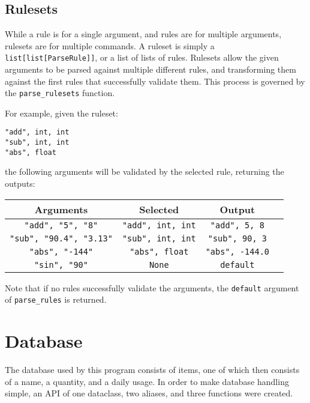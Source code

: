 \documentclass{article}
\begin{document}
			\subsection{Rulesets}
			While a rule is for a single argument, and rules are for multiple arguments, rulesets
			are for multiple commands. A ruleset is simply a \verb|list[list[ParseRule]]|, or a
			list of lists of rules. Rulesets allow the given arguments to be parsed against
			multiple different rules, and transforming them against the first rules that
			successfully validate them. This process is governed by the \verb|parse_rulesets|
			function.

			For example, given the ruleset:

			\begin{center}
				\verb|"add", int, int| \\
				\verb|"sub", int, int| \\
				\verb|"abs", float|    \\
			\end{center}

			the following arguments will be validated by the selected rule, returning the outputs:

			\begin{center}
				\begin{tabular}{|c|c|c|c|}
					\hline
					Arguments & Selected & Output
					\\ \hline
						\verb|"add", "5", "8"| &
						\verb|"add", int, int| &
						\verb|"add", 5, 8|
					\\ \hline
						\verb|"sub", "90.4", "3.13"| &
						\verb|"sub", int, int| &
						\verb|"sub", 90, 3|
					\\ \hline
						\verb|"abs", "-144"| &
						\verb|"abs", float| &
						\verb|"abs", -144.0|
					\\ \hline
						\verb|"sin", "90"| &
						\verb|None| &
						\verb|default|
					\\ \hline
				\end{tabular}
			\end{center}

			Note that if no rules successfully validate the arguments, the \verb|default| argument of
			\verb|parse_rules| is returned.

		\pagebreak

	\section{Database}
		The database used by this program consists of items, one of which then consists of a name,
		a quantity, and a daily usage. In order to make database handling simple, an API of one
		dataclass, two aliases, and three functions were created.
\end{document}
